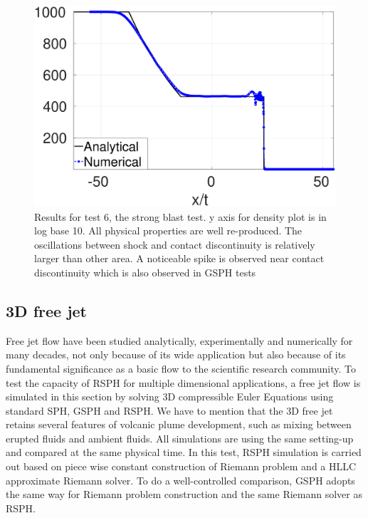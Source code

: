 \begin{figure}
\begin{minipage}{.495 \textwidth}
    \end{minipage}%
    \begin{minipage}{.495 \textwidth}
        \centering
        \includegraphics[width=0.99 \textwidth]{Chapter-4/Figures/strong-blast/StrBlst-RCM-p-Rp3}
    \end{minipage}%
    \caption{Results for test 6, the strong blast test. y axis for density plot is in log base 10. All physical properties are well re-produced. The oscillations between shock and contact discontinuity is relatively larger than other area. A noticeable spike is observed near contact discontinuity which is also observed in GSPH tests \cite{cha2003implementations}}
    \label{fig:RCM-strong-blast}
\end{figure}

\subsection{3D free jet}
Free jet flow have been studied analytically, experimentally and numerically for many decades, not only because of its wide application but also because of its fundamental significance as a basic flow to the scientific research community. To test the capacity of RSPH for multiple dimensional applications, a free jet flow is simulated in this section by solving 3D compressible Euler Equations using standard SPH, GSPH and RSPH. We have to mention that the 3D free jet retains several features of volcanic plume development, such as mixing between erupted fluids and ambient fluids.
All simulations are using the same setting-up and compared at the same physical time. In this test, RSPH simulation is carried out based on piece wise constant construction of Riemann problem and a HLLC approximate Riemann solver. To do a well-controlled comparison, GSPH adopts the same way for Riemann problem construction and the same Riemann solver as RSPH. 

